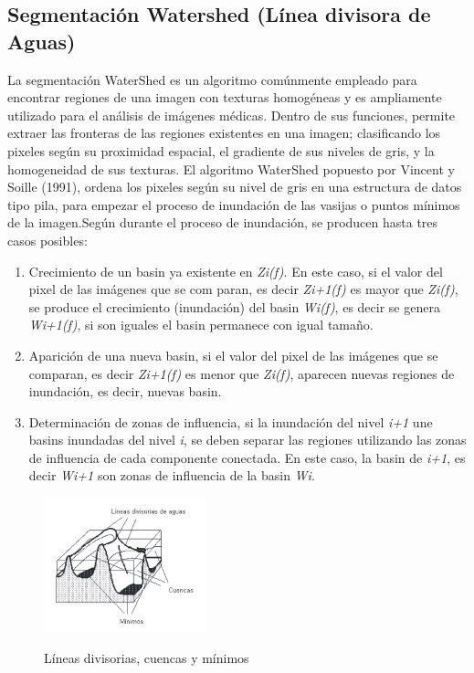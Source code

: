 \documentclass[12pt]{article}
\begin{document}
\subsection{\color{Black}Segmentación Watershed (Línea divisora de Aguas)}
\justifying

La segmentación WaterShed es un algoritmo comúnmente empleado para encontrar regiones de una imagen con texturas homogéneas y es ampliamente utilizado para el análisis de imágenes médicas. Dentro de sus funciones, permite extraer las fronteras de las regiones existentes en una imagen; clasificando los pixeles según su proximidad espacial, el gradiente de sus niveles de gris, y la homogeneidad de sus texturas. El algoritmo WaterShed popuesto por Vincent y Soille (1991), ordena los pixeles según su nivel de gris en una estructura de datos tipo pila, para empezar el proceso de inundación de las vasijas o puntos mínimos de la imagen.Según \cite{palomino2010watershed} durante el proceso de inundación, se producen hasta tres casos posibles:

\begin{enumerate}
	\item Crecimiento de un basin ya existente en \textit{Zi(f)}. En este 
caso, si el valor del pixel de las imágenes que se com
paran, es decir \textit{Zi+1(f)} es mayor que \textit{Zi(f)}, se produce 
el crecimiento (inundación) del basin \textit{Wi(f)}, es decir se 
genera \textit{Wi+1(f)}, si son iguales el basin permanece con 
igual tamaño.
	\item Aparición de una nueva basin, si el valor del pixel de las 
imágenes que se comparan, es decir \textit{Zi+1(f)} es menor 
que \textit{Zi(f)}, aparecen nuevas regiones de inundación, es 
decir, nuevas basin.
	\item Determinación de zonas de influencia, si la inundación 
del nivel \textit{i+1} une basins inundadas del nivel \textit{i}, se deben 
separar las regiones utilizando las zonas de influencia 
de cada componente conectada. En este caso, la basin de \textit{i+1}, es decir \textit{Wi+1} son zonas de influencia de la 
basin \textit{Wi}.
\end{enumerate}
\begin{figure}[htb]
\centering
\includegraphics[width=0.42\textwidth]{water}\\
\caption{ Líneas divisorias, cuencas y mínimos \cite{palomino2010watershed} } \small
\label{f3}
\end{figure}
\end{document}
